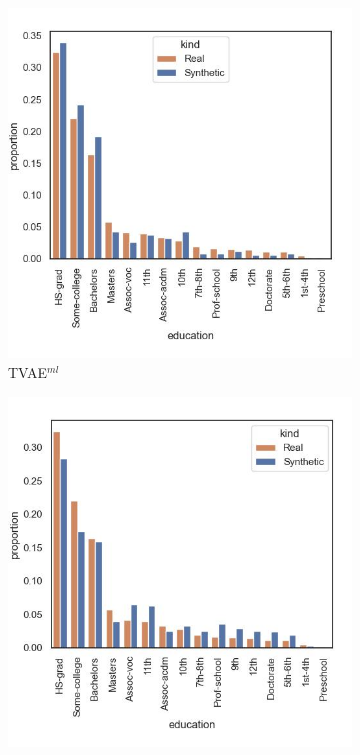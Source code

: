 \begin{figure}[h]
	\centering
	\begin{subfigure}{0.23\textwidth}
		\centering
		\includegraphics[width=\textwidth]{images/dist_education/tvae.jpg}
		\caption{TVAE$^{ml}$}
	\end{subfigure}
	\begin{subfigure}{0.23\textwidth}
		\centering
		\includegraphics[width=\textwidth]{images/dist_education/ctabgan.jpg}

\end{subfigure}
\end{figure}
